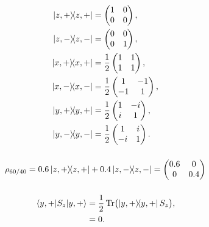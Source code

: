 \documentclass[a4paper,12pt,twoside]{article}
\begin{document}
\subsubsection{}
\begin{align}
	\op{z,+} &= \begin{pmatrix}
		1 & 0 \\ 0 & 0
	\end{pmatrix},\\
	\op{z,-} &= \begin{pmatrix}
		0 & 0 \\ 0 & 1
	\end{pmatrix},\\
	\op{x,+} &= \frac{1}{2}\begin{pmatrix}
		1 & 1 \\ 1 & 1
	\end{pmatrix},\\
	\op{x,-} &= \frac{1}{2}\begin{pmatrix}
		1 & -1 \\ -1 & 1
	\end{pmatrix},\\
	\op{y,+} &= \frac{1}{2}\begin{pmatrix}
		1 & -i \\ i & 1
	\end{pmatrix},\\
	\op{y,-} &= \frac{1}{2}\begin{pmatrix}
		1 & i \\ -i & 1
	\end{pmatrix}.
\end{align}
\subsubsection{}
\begin{equation}
	\rho_{60/40} = 0.6\op{z,+}+0.4\op{z,-} = \begin{pmatrix}
		0.6 & 0 \\ 0 & 0.4
	\end{pmatrix}
\end{equation}
\subsubsection{}
\begin{align}
	\ev{S_z}{y,+} &= \frac{1}{2}\Tr(\op{y,+}S_z),\\
	&= 0.
\end{align}

\setcounter{subsection}{16}
\subsection{}%
\end{document}
